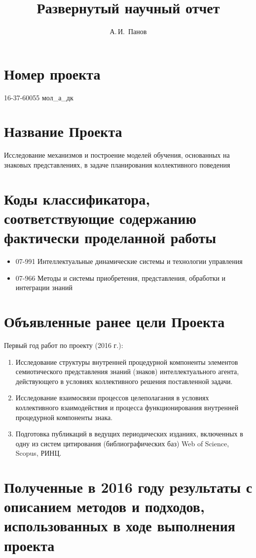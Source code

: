 \documentclass[12pt]{report}
\title{Развернутый научный отчет}
\author{А.\,И.~Панов}
\begin{document}
	\maketitle
	\setcounter{chapter}{3}
	\section{Номер проекта}
	16-37-60055 мол\_а\_дк
	
	\section{Название Проекта}
	Исследование механизмов и построение моделей обучения, основанных на знаковых представлениях, в задаче планирования коллективного поведения
	
	\section{Коды классификатора, соответствующие содержанию фактически проделанной работы}
	\begin{itemize}
		\item 07-991 Интеллектуальные динамические системы и технологии управления
		\item 07-966 Методы и системы приобретения, представления, обработки и интеграции знаний
	\end{itemize}

	\section{Объявленные ранее цели Проекта}
	Первый год работ по проекту (2016 г.): 
	\begin{enumerate}
		\item Исследование структуры внутренней процедурной компоненты элементов семиотического представления знаний (знаков) интеллектуального агента, действующего в условиях коллективного решения поставленной задачи. 
		\item Исследование взаимосвязи процессов целеполагания в условиях коллективного взаимодействия и процесса функционирования внутренней процедурной компоненты знака. 
		\item Подготовка публикаций в ведущих периодических изданиях, включенных в одну из систем цитирования (библиографических баз) Web of Science, Scopus, РИНЦ.
	\end{enumerate}
	
	\section{Полученные в 2016 году результаты с описанием методов и подходов, использованных в ходе выполнения проекта}
	
\end{document}
